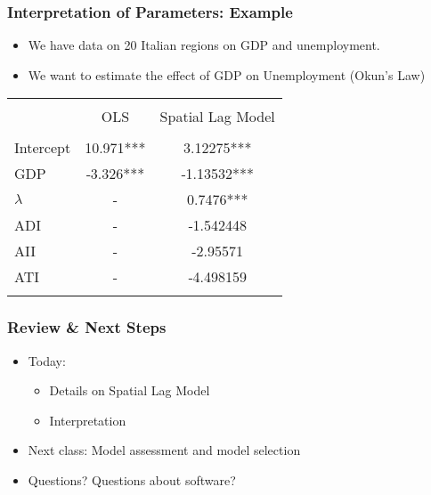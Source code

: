 \documentclass[
  shownotes,
  xcolor={svgnames},
  hyperref={colorlinks,citecolor=DarkBlue,linkcolor=DarkRed,urlcolor=DarkBlue}
  ]{beamer}
\begin{document}
\begin{frame}
\frametitle{Interpretation of Parameters: Example}
\begin{itemize}
  \item We have data on 20 Italian regions on GDP and unemployment. 
  \item We want to estimate the effect of GDP on Unemployment (Okun's Law)
\end{itemize}


\begin{table}[H]
\begin{tabular}{lcc} \\
[-1.8ex] \hline \hline \\[-1.8ex]
          & OLS       & Spatial Lag Model \\
 \hline \\[-1.8ex]          
Intercept & 10.971*** & 3.12275***        \\
GDP       & ‐3.326*** & ‐1.13532***       \\
$\lambda$ & -         & 0.7476***         \\
ADI       & -         & ‐1.542448         \\
AII       & -         & -2.95571           \\
ATI       & -         & ‐4.498159        \\
\hline \hline \\[-1.8ex]
\end{tabular}
\end{table}

\end{frame}
\begin{frame}
\frametitle{Review \& Next Steps}
  
  \begin{itemize} 
    \item Today:
    \medskip
    \begin{itemize} 
        \item Details on Spatial Lag Model
        \medskip
        \item Interpretation
        \medskip
      \end{itemize}
  	\bigskip  

	\item  Next class: Model assessment and model selection


\bigskip  
\item Questions? Questions about software? 

\end{itemize}
\end{frame}
\end{document}
